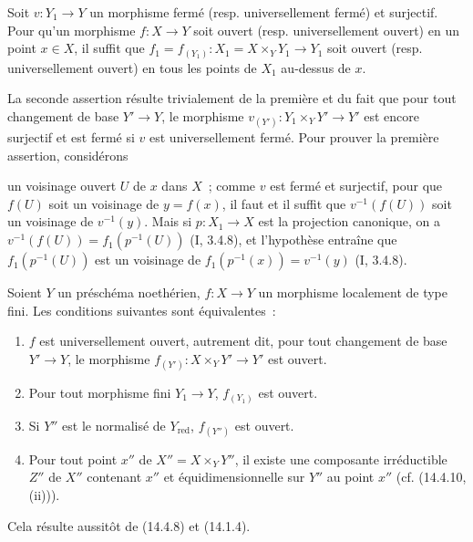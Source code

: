 \begin{lemma}[14.4.8.1]
\label{IV.14.4.8.1-fr}
Soit $v:Y_1\to Y$ un morphisme fermé (resp. universellement fermé) et surjectif.
Pour qu'un morphisme $f:X\to Y$ soit ouvert (resp. universellement ouvert) en un
point $x\in X$, il suffit que $f_1=f_{(Y_1)}:X_1=X\times_Y Y_1\to Y_1$ soit ouvert
(resp. universellement ouvert) en tous les points de $X_1$ au-dessus de $x$.
\end{lemma}

La seconde assertion résulte trivialement de la première et du fait que pour tout
changement de base $Y'\to Y$, le morphisme
$v_{(Y')}:Y_1\times_Y Y'\to Y'$ est encore surjectif et est fermé si $v$ est
universellement fermé. Pour prouver la première assertion, considérons


un voisinage ouvert $U$ de $x$ dans $X$~; comme $v$ est fermé et surjectif, pour
que $f(U)$ soit un voisinage de $y=f(x)$, il faut et il suffit que
$v^{-1}(f(U))$ soit un voisinage de $v^{-1}(y)$. Mais si $p:X_1\to X$ est la
projection canonique, on a $v^{-1}(f(U))=f_1(p^{-1}(U))$ (I, 3.4.8), et
l'hypothèse entraîne que $f_1(p^{-1}(U))$ est un voisinage de
$f_1(p^{-1}(x))=v^{-1}(y)$ (I, 3.4.8).

\begin{corollary}[14.4.9]
\label{IV.14.4.9-fr}
Soient $Y$ un préschéma noethérien, $f:X\to Y$ un morphisme localement de type
fini. Les conditions suivantes sont équivalentes~:
\begin{enumerate}[label=\emph{\alph*)}]
  \item $f$ est universellement ouvert, autrement dit, pour tout changement de
  base $Y'\to Y$, le morphisme $f_{(Y')}:X\times_Y Y'\to Y'$ est ouvert.
  \item[a$'$)] Pour tout morphisme fini $Y_1\to Y$, $f_{(Y_1)}$ est ouvert.
  \item[a$''$)] Si $Y''$ est le normalisé de $Y_{\mathrm{red}}$, $f_{(Y'')}$ est
  ouvert.
  \item Pour tout point $x''$ de $X''=X\times_Y Y''$, il existe une composante
  irréductible $Z''$ de $X''$ contenant $x''$ et équidimensionnelle sur $Y''$ au
  point $x''$ (cf. (14.4.10, (ii))).
\end{enumerate}
\end{corollary}

Cela résulte aussitôt de (14.4.8) et (14.1.4).

